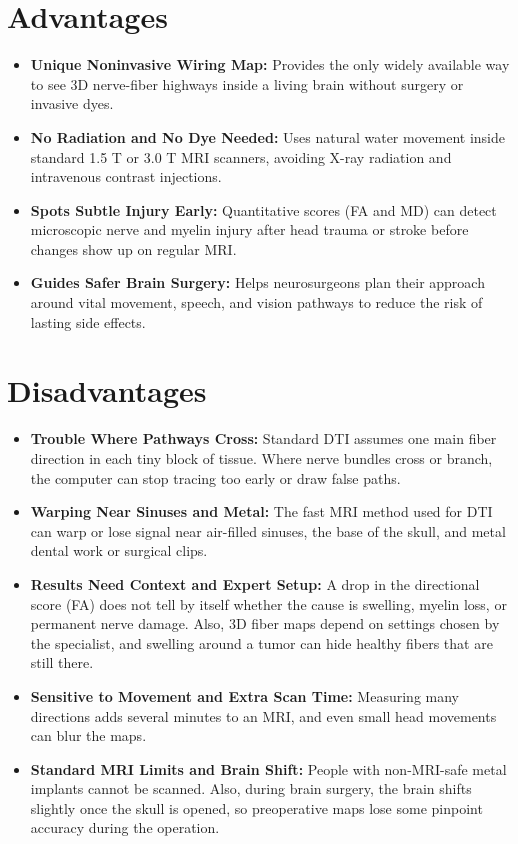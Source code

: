 \section{Advantages}

\begin{itemize}
    \item \textbf{Unique Noninvasive Wiring Map:} Provides the only widely available way to see 3D nerve-fiber highways inside a living brain without surgery or invasive dyes.
    \item \textbf{No Radiation and No Dye Needed:} Uses natural water movement inside standard 1.5 T or 3.0 T MRI scanners, avoiding X-ray radiation and intravenous contrast injections.
    \item \textbf{Spots Subtle Injury Early:} Quantitative scores (FA and MD) can detect microscopic nerve and myelin injury after head trauma or stroke before changes show up on regular MRI.
    \item \textbf{Guides Safer Brain Surgery:} Helps neurosurgeons plan their approach around vital movement, speech, and vision pathways to reduce the risk of lasting side effects.
\end{itemize}

\section{Disadvantages}

\begin{itemize}
    \item \textbf{Trouble Where Pathways Cross:} Standard DTI assumes one main fiber direction in each tiny block of tissue. Where nerve bundles cross or branch, the computer can stop tracing too early or draw false paths.
    \item \textbf{Warping Near Sinuses and Metal:} The fast MRI method used for DTI can warp or lose signal near air-filled sinuses, the base of the skull, and metal dental work or surgical clips.
    \item \textbf{Results Need Context and Expert Setup:} A drop in the directional score (FA) does not tell by itself whether the cause is swelling, myelin loss, or permanent nerve damage. Also, 3D fiber maps depend on settings chosen by the specialist, and swelling around a tumor can hide healthy fibers that are still there.
    \item \textbf{Sensitive to Movement and Extra Scan Time:} Measuring many directions adds several minutes to an MRI, and even small head movements can blur the maps.
    \item \textbf{Standard MRI Limits and Brain Shift:} People with non-MRI-safe metal implants cannot be scanned. Also, during brain surgery, the brain shifts slightly once the skull is opened, so preoperative maps lose some pinpoint accuracy during the operation.
\end{itemize}


